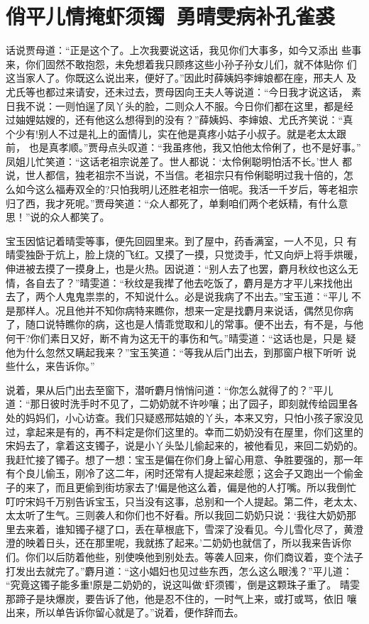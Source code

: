 \chapter{俏平儿情掩虾须镯~勇晴雯病补孔雀裘}

话说贾母道：“正是这个了。上次我要说这话，我见你们大事多，如今又添出
些事来，你们固然不敢抱怨，未免想着我只顾疼这些小孙子孙女儿们，就不体贴你
们这当家人了。你既这么说出来，便好了。”因此时薛姨妈李婶娘都在座，邢夫人
及尤氏等也都过来请安，还未过去，贾母因向王夫人等说道：“今日我才说这话，
素日我不说：一则怕逞了凤丫头的脸，二则众人不服。今日你们都在这里，都是经
过妯娌姑嫂的，还有他这么想得到的没有？”薛姨妈、李婶娘、尤氏齐笑说：“真
个少有!别人不过是礼上的面情儿，实在他是真疼小姑子小叔子。就是老太太跟前，
也是真孝顺。”贾母点头叹道：“我虽疼他，我又怕他太伶俐了，也不是好事。”
凤姐儿忙笑道：“这话老祖宗说差了。世人都说：‘太伶俐聪明怕活不长。’世人
都说，世人都信，独老祖宗不当说，不当信。老祖宗只有伶俐聪明过我十倍的，怎
么如今这么福寿双全的?只怕我明儿还胜老祖宗一倍呢。我活一千岁后，等老祖宗
归了西，我才死呢。”贾母笑道：“众人都死了，单剩咱们两个老妖精，有什么意
思！”说的众人都笑了。

宝玉因惦记着晴雯等事，便先回园里来。到了屋中，药香满室，一人不见，只
有晴雯独卧于炕上，脸上烧的飞红。又摸了一摸，只觉烫手，忙又向炉上将手烘暖，
伸进被去摸了一摸身上，也是火热。因说道：“别人去了也罢，麝月秋纹也这么无
情，各自去了？”晴雯道：“秋纹是我撵了他去吃饭了，麝月是方才平儿来找他出
去了，两个人鬼鬼祟祟的，不知说什么。必是说我病了不出去。”宝玉道：“平儿
不是那样人。况且他并不知你病特来瞧你，想来一定是找麝月来说话，偶然见你病
了，随口说特瞧你的病，这也是人情乖觉取和儿的常事。便不出去，有不是，与他
何干?你们素日又好，断不肯为这无干的事伤和气。”晴雯道：“这话也是，只是
疑他为什么忽然又瞒起我来？”宝玉笑道：“等我从后门出去，到那窗户根下听听
说些什么，来告诉你。”

说着，果从后门出去至窗下，潜听麝月悄悄问道：“你怎么就得了的？”平儿
道：“那日彼时洗手时不见了，二奶奶就不许吵嚷；出了园子，即刻就传给园里各
处的妈妈们，小心访查。我们只疑惑邢姑娘的丫头，本来又穷，只怕小孩子家没见
过，拿起来是有的，再不料定是你们这里的。幸而二奶奶没有在屋里，你们这里的
宋妈去了，拿着这支镯子，说是小丫头坠儿偷起来的，被他看见，来回二奶奶的。
我赶忙接了镯子。想了一想：宝玉是偏在你们身上留心用意、争胜要强的，那一年
有个良儿偷玉，刚冷了这二年，闲时还常有人提起来趁愿；这会子又跑出一个偷金
子的来了，而且更偷到街坊家去了!偏是他这么着，偏是他的人打嘴。所以我倒忙
叮咛宋妈千万别告诉宝玉，只当没有这事，总别和一个人提起。第二件，老太太、
太太听了生气。三则袭人和你们也不好看。所以我回二奶奶只说：‘我往大奶奶那
里去来着，谁知镯子褪了口，丢在草根底下，雪深了没看见。今儿雪化尽了，黄澄
澄的映着日头，还在那里呢，我就拣了起来。’二奶奶也就信了，所以我来告诉你
们。你们以后防着他些，别使唤他到别处去。等袭人回来，你们商议着，变个法子
打发出去就完了。”麝月道：“这小娼妇也见过些东西，怎么这么眼浅？”平儿道：
“究竟这镯子能多重!原是二奶奶的，说这叫做‘虾须镯’，倒是这颗珠子重了。
晴雯那蹄子是块爆炭，要告诉了他，他是忍不住的，一时气上来，或打或骂，依旧
嚷出来，所以单告诉你留心就是了。”说着，便作辞而去。

